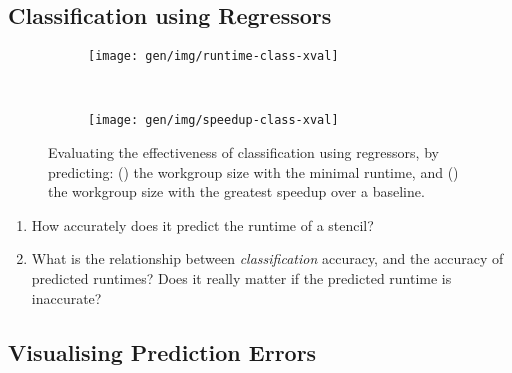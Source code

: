 \subsection{Classification using Regressors}

\begin{figure}
\centering
\begin{subfigure}[h]{.45\textwidth}
\centering
\texttt{[image: gen/img/runtime-class-xval]}
\caption{}
\label{fig:runtime-class-xval}
\end{subfigure}
~%
\begin{subfigure}[h]{.45\textwidth}
\centering
\texttt{[image: gen/img/speedup-class-xval]}
\caption{}
\label{fig:speedup-class-xval}
\end{subfigure}
\caption{%
  Evaluating the effectiveness of classification using regressors, by
  predicting: () the workgroup size
  with the minimal runtime, and () the
  workgroup size with the greatest speedup over a baseline.%
}
\label{fig:regression-class}
\end{figure}



\begin{enumerate}
\item How accurately does it predict the runtime of a stencil?
\item What is the relationship between \emph{classification} accuracy,
  and the accuracy of predicted runtimes? Does it really matter if the
  predicted runtime is inaccurate?
\end{enumerate}


\subsection{Visualising Prediction Errors}

